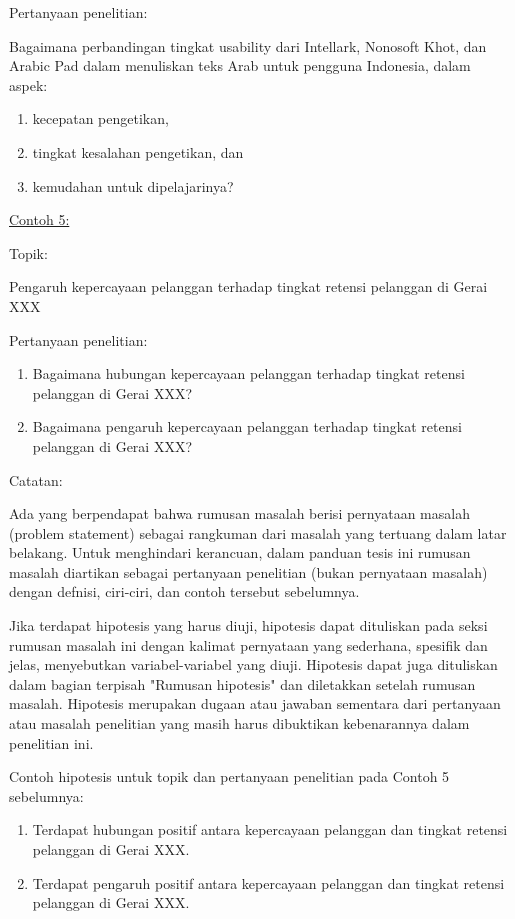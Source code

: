 \noindent Pertanyaan penelitian:
\begin{displayquote}
  Bagaimana perbandingan tingkat usability dari Intellark, Nonosoft Khot, dan Arabic Pad dalam menuliskan teks Arab untuk pengguna Indonesia, dalam aspek:
  \begin{enumerate}
    \item kecepatan pengetikan,
    \item tingkat kesalahan pengetikan, dan
    \item kemudahan untuk dipelajarinya?   
  \end{enumerate}
\end{displayquote}

\noindent\underline{Contoh 5:}

\noindent Topik:

\begin{displayquote}
  Pengaruh kepercayaan pelanggan terhadap tingkat retensi pelanggan di Gerai XXX
\end{displayquote}

\noindent Pertanyaan penelitian:

\begin{enumerate}
  \item Bagaimana hubungan kepercayaan pelanggan terhadap tingkat retensi pelanggan di Gerai XXX?
  \item Bagaimana pengaruh kepercayaan pelanggan terhadap tingkat retensi pelanggan di Gerai XXX?  
\end{enumerate}

\noindent Catatan: 

Ada yang berpendapat bahwa rumusan masalah berisi pernyataan masalah (problem statement) sebagai rangkuman dari masalah yang tertuang dalam latar belakang. Untuk menghindari kerancuan, dalam panduan tesis ini rumusan masalah diartikan sebagai pertanyaan penelitian (bukan pernyataan masalah) dengan defnisi, ciri-ciri, dan contoh tersebut sebelumnya. 

Jika terdapat hipotesis yang harus diuji, hipotesis dapat dituliskan pada seksi rumusan masalah ini dengan kalimat pernyataan yang sederhana, spesifik dan jelas, menyebutkan variabel-variabel yang diuji. Hipotesis dapat juga dituliskan dalam bagian terpisah "Rumusan hipotesis" dan diletakkan setelah rumusan masalah. Hipotesis merupakan dugaan atau jawaban sementara dari pertanyaan atau masalah penelitian yang masih harus dibuktikan kebenarannya dalam penelitian ini.

Contoh hipotesis untuk topik dan pertanyaan penelitian pada Contoh 5 sebelumnya:
\begin{enumerate}
  \item Terdapat hubungan positif antara kepercayaan pelanggan dan tingkat retensi pelanggan di Gerai XXX. 
  \item Terdapat pengaruh positif antara kepercayaan pelanggan dan tingkat retensi pelanggan di Gerai XXX.
\end{enumerate}


